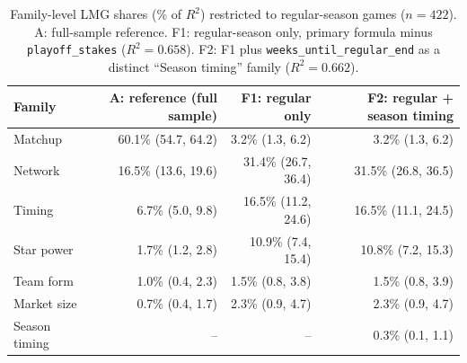 \begin{table}[ht]
\centering
\caption{Family-level LMG shares (\% of $R^2$) restricted to regular-season games ($n=422$). A: full-sample reference. F1: regular-season only, primary formula minus \texttt{playoff\_stakes} ($R^2=0.658$). F2: F1 plus \texttt{weeks\_until\_regular\_end} as a distinct ``Season timing'' family ($R^2=0.662$).} 
\label{tab:regular_season}
\begin{tabular}{lrrr}
  \toprule
Family & A: reference (full sample) & F1: regular only & F2: regular + season timing \\ 
  \midrule
Matchup & 60.1\% (54.7, 64.2) & 3.2\% (1.3, 6.2) & 3.2\% (1.3, 6.2) \\ 
  Network & 16.5\% (13.6, 19.6) & 31.4\% (26.7, 36.4) & 31.5\% (26.8, 36.5) \\ 
  Timing & 6.7\% (5.0, 9.8) & 16.5\% (11.2, 24.6) & 16.5\% (11.1, 24.5) \\ 
  Star power & 1.7\% (1.2, 2.8) & 10.9\% (7.4, 15.4) & 10.8\% (7.2, 15.3) \\ 
  Team form & 1.0\% (0.4, 2.3) & 1.5\% (0.8, 3.8) & 1.5\% (0.8, 3.9) \\ 
  Market size & 0.7\% (0.4, 1.7) & 2.3\% (0.9, 4.7) & 2.3\% (0.9, 4.7) \\ 
  Season timing & -- & -- & 0.3\% (0.1, 1.1) \\ 
   \bottomrule
\end{tabular}
\end{table}
